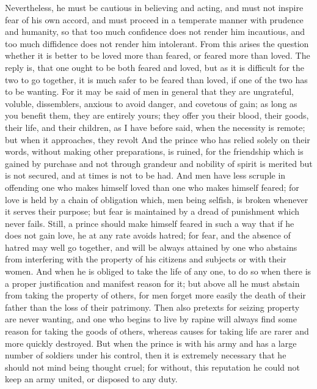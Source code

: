 \documentclass[12pt,letterpaper]{memoir}
\begin{document}
Nevertheless, he must be cautious in believing and acting, and must
not inspire fear of his own accord, and must proceed in a temperate
manner with prudence and humanity, so that too much confidence does
not render him incautious, and too much diffidence does not render him
intolerant. From this arises the question whether it is better to be
loved more than feared, or feared more than loved. The reply is, that
one ought to be both feared and loved, but as it is difficult for the
two to go together, it is much safer to be feared than loved, if one of
the two has to be wanting. For it may be said of men in general that
they are ungrateful, voluble, dissemblers, anxious to avoid danger,
and covetous of gain; as long as you benefit them, they are entirely
yours; they offer you their blood, their goods, their life, and their
children, as I have before said, when the necessity is remote; but
when it approaches, they revolt And the prince who has relied solely
on their words, without making other preparations, is ruined, for the
friendship which is gained by purchase and not through grandeur and
nobility of spirit is merited but is not secured, and at times is not
to be had. And men have less scruple in offending one who makes himself
loved than one who makes himself feared; for love is held by a chain of
obligation which, men being selfish, is broken whenever it serves their
purpose; but fear is maintained by a dread of punishment which never
fails. Still, a prince should make himself feared in such a way that if
he does not gain love, he at any rate avoids hatred; for fear, and the
absence of hatred may well go together, and will be always attained by
one who abstains from interfering with the property of his citizens and
subjects or with their women. And when he is obliged to take the life
of any one, to do so when there is a proper justification and manifest
reason for it; but above all he must abstain from taking the property
of others, for men forget more easily the death of their father than
the loss of their patrimony. Then also pretexts for seizing property
are never wanting, and one who begins to live by rapine will always
find some reason for taking the goods of others, whereas causes for
taking life are rarer and more quickly destroyed. But when the prince
is with his army and has a large number of soldiers under his control,
then it is extremely necessary that he should not mind being thought
cruel; for without, this reputation he could not keep an army united,
or disposed to any duty.
\end{document}

